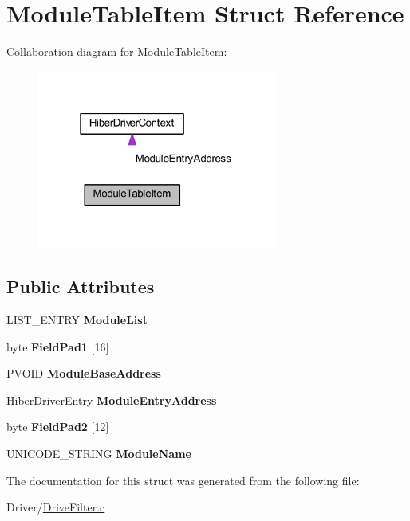 \hypertarget{struct_module_table_item}{}\section{Module\+Table\+Item Struct Reference}
\label{struct_module_table_item}


Collaboration diagram for Module\+Table\+Item\+:
\nopagebreak
\begin{figure}[H]
\begin{center}
\leavevmode
\includegraphics[width=223pt]{struct_module_table_item__coll__graph}
\end{center}
\end{figure}
\subsection*{Public Attributes}
\begin{DoxyCompactItemize}
\item 
\mbox{\label{struct_module_table_item_a5b9b8938cbe8fd0ff40be6e66b979344}} 
L\+I\+S\+T\+\_\+\+E\+N\+T\+RY {\bfseries Module\+List}
\item 
\mbox{\label{struct_module_table_item_a2f6e7aacb45748adbb263ec9a60c8355}} 
byte {\bfseries Field\+Pad1} \mbox{[}16\mbox{]}
\item 
\mbox{\label{struct_module_table_item_a7862070cdbbba7453e574d7efc2dc512}} 
P\+V\+O\+ID {\bfseries Module\+Base\+Address}
\item 
\mbox{\label{struct_module_table_item_a433395704369fd1e1126c3f655a03a0e}} 
Hiber\+Driver\+Entry {\bfseries Module\+Entry\+Address}
\item 
\mbox{\label{struct_module_table_item_a82e2686c97cb49bd7403cb10cc0af406}} 
byte {\bfseries Field\+Pad2} \mbox{[}12\mbox{]}
\item 
\mbox{\label{struct_module_table_item_ac56028baca11d8a206a19f6082fe5702}} 
U\+N\+I\+C\+O\+D\+E\+\_\+\+S\+T\+R\+I\+NG {\bfseries Module\+Name}
\end{DoxyCompactItemize}


The documentation for this struct was generated from the following file\+:\begin{DoxyCompactItemize}
\item 
Driver/\hyperlink{_drive_filter_8c}{Drive\+Filter.\+c}\end{DoxyCompactItemize}
